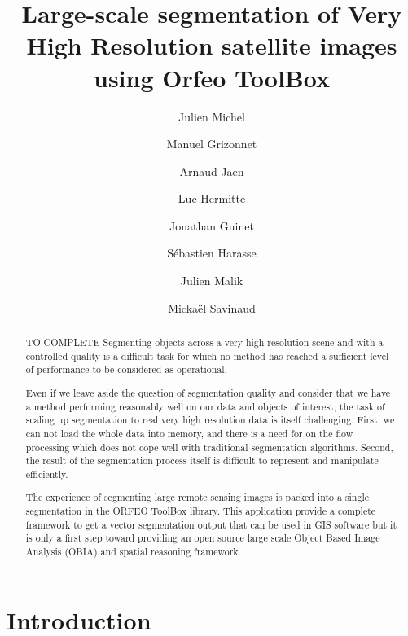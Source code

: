 \documentclass{josis}
\begin{document}
\title{Large-scale segmentation of Very High Resolution satellite images using Orfeo ToolBox}

\author{Julien Michel}
\author{Manuel Grizonnet}
\author{Arnaud Jaen}
\author{Luc Hermitte}
\author{Jonathan Guinet}
\author{S\'ebastien Harasse}
\author{Julien Malik}
\author{Micka\"el Savinaud}


\maketitle


\begin{abstract}
TO COMPLETE
Segmenting objects across a very high resolution scene and with a controlled
quality is a difficult task for which no method has reached a sufficient level
of performance to be considered as operational.

Even if we leave aside the question of segmentation quality and consider that we
have a method performing reasonably well on our data and objects of interest,
the task of scaling up segmentation to real very high resolution data is itself
challenging. First, we can not load the whole data into memory, and there is a
need for on the flow processing which does not cope well with traditional
segmentation algorithms. Second, the result of the segmentation process itself
is difficult to represent and manipulate efficiently.

The experience of segmenting large remote sensing images is packed into a single
segmentation in the ORFEO ToolBox library. This application provide a complete
framework to get a vector segmentation output that can be used in GIS software
but it is only a first step toward providing an open source large scale Object
Based Image Analysis (OBIA) and spatial reasoning framework.

\end{abstract}


\section{Introduction}
\end{document}
